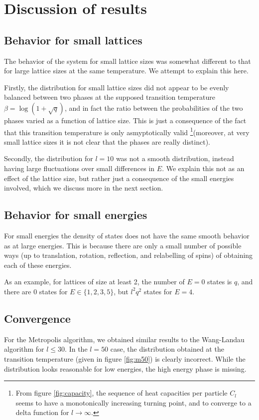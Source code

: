 \documentclass{article}
\begin{document}
\section{Discussion of results}
\subsection{Behavior for small lattices}
The behavior of the system for small lattice sizes was somewhat different to that for large lattice sizes at the same temperature.
We attempt to explain this here.

Firstly, the distribution for small lattice sizes did not appear to be evenly balanced between two phases at the supposed transition temperature $\beta = \log(1+\sqrt q)$, and in fact the ratio between the probabilities of the two phases varied as a function of lattice size.
This is just a consequence of the fact that this transition temperature is only asmyptotically valid \footnote{From figure \ref{fig:capacity}, the sequence of heat capacities per particle $C_l$ seems to have a monotonically increasing turning point, and to converge to a delta function for $l \rightarrow \infty$.}(moreover, at very small lattice sizes it is not clear that the phases are really distinct).

Secondly, the distribution for $l = 10$ was not a smooth distribution, instead having large fluctuations over small differences in $E$.
We explain this not as an effect of the lattice size, but rather just a consequence of the small energies involved, which we discuss more in the next section.

\subsection{Behavior for small energies}
For small energies the density of states does not have the same smooth behavior as at large energies.
This is because there are only a small number of possible ways (up to translation, rotation, reflection, and relabelling of spins) of obtaining each of these energies.

As an example, for lattices of size at least 2, the number of $E = 0$ states is $q$, and there are $0$ states for $E \in \{1,2,3,5\}$, but $l^2q^2$ states for $E = 4$.

\subsection{Convergence}
For the Metropolis algorithm, we obtained similar results to the Wang-Landau algorithm for $l \leq 30$.
In the $l = 50$ case, the distribution obtained at the transition temperature (given in figure \ref{fig:m50}) is clearly incorrect.
While the distribution looks reasonable for low energies, the high energy phase is missing.
\end{document}
